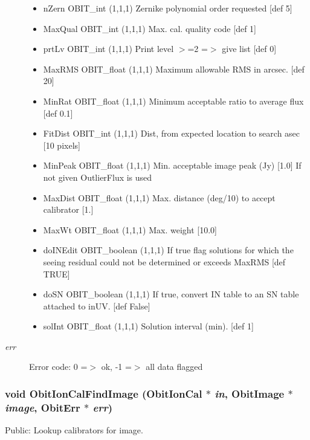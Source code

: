 \begin{Desc}
\begin{description}
\begin{itemize}
\item n\-Zern OBIT\_\-int (1,1,1) Zernike polynomial order requested [def 5] \item Max\-Qual OBIT\_\-int (1,1,1) Max. cal. quality code [def 1] \item prt\-Lv OBIT\_\-int (1,1,1) Print level $>$=2 =$>$ give list [def 0] \item Max\-RMS OBIT\_\-float (1,1,1) Maximum allowable RMS in arcsec. [def 20] \item Min\-Rat OBIT\_\-float (1,1,1) Minimum acceptable ratio to average flux [def 0.1] \item Fit\-Dist OBIT\_\-int (1,1,1) Dist, from expected location to search asec [10 pixels] \item Min\-Peak OBIT\_\-float (1,1,1) Min. acceptable image peak (Jy) [1.0] If not given Outlier\-Flux is used \item Max\-Dist OBIT\_\-float (1,1,1) Max. distance (deg/10) to accept calibrator [1.] \item Max\-Wt OBIT\_\-float (1,1,1) Max. weight [10.0] \item do\-INEdit OBIT\_\-boolean (1,1,1) If true flag solutions for which the seeing residual could not be determined or exceeds Max\-RMS [def TRUE] \item do\-SN OBIT\_\-boolean (1,1,1) If true, convert IN table to an SN table attached to in\-UV. [def False] \item sol\-Int OBIT\_\-float (1,1,1) Solution interval (min). [def 1] \end{itemize}
\item[{\em err}]Error code: 0 =$>$ ok, -1 =$>$ all data flagged \end{description}
\end{Desc}
\subsubsection{\setlength{\rightskip}{0pt plus 5cm}void Obit\-Ion\-Cal\-Find\-Image ({\bf Obit\-Ion\-Cal} $\ast$ {\em in}, {\bf Obit\-Image} $\ast$ {\em image}, {\bf Obit\-Err} $\ast$ {\em err})}\label{ObitIonCal_8c_a46}


Public: Lookup calibrators for image. 

